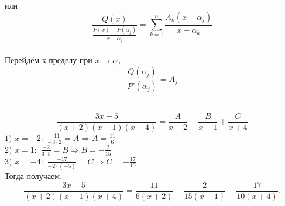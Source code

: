 \begin{enumerate}
	или\\
	$$\frac{Q(x)}{\frac{P(x)-P(\alpha_j)}{x-\alpha_j}}=\sum\limits_{k=1}^n\frac{A_k(x-\alpha_j)}{x-\alpha_k}$$\\
	Перейдём к пределу при $x\rightarrow \alpha_j$\\
	$$\frac{Q(\alpha_j)}{P'(\alpha_j)}=A_j$$\\
	\begin{example} $$\frac{3x-5}{(x+2)(x-1)(x+4)}=\frac{A}{x+2}+\frac{B}{x-1}+\frac{C}{x+4}$$
		$1)$ $x=-2:$ $\frac{-11}{-3\cdot2}=A\Rightarrow A=\frac{11}{6}$\\
		$2)$ $x=1:$ $\frac{-2}{3\cdot5}=B\Rightarrow B=-\frac{2}{15}$\\
		$3)$ $x=-4:$ $\frac{-17}{-2\cdot(-5)}=C\Rightarrow C=-\frac{17}{10}$\\
		Тогда получаем,
		$$\frac{3x-5}{(x+2)(x-1)(x+4)}=\frac{11}{6(x+2)}-\frac{2}{15(x-1)}-\frac{17}{10(x+4)}.$$
	\end{example}
\end{enumerate}
